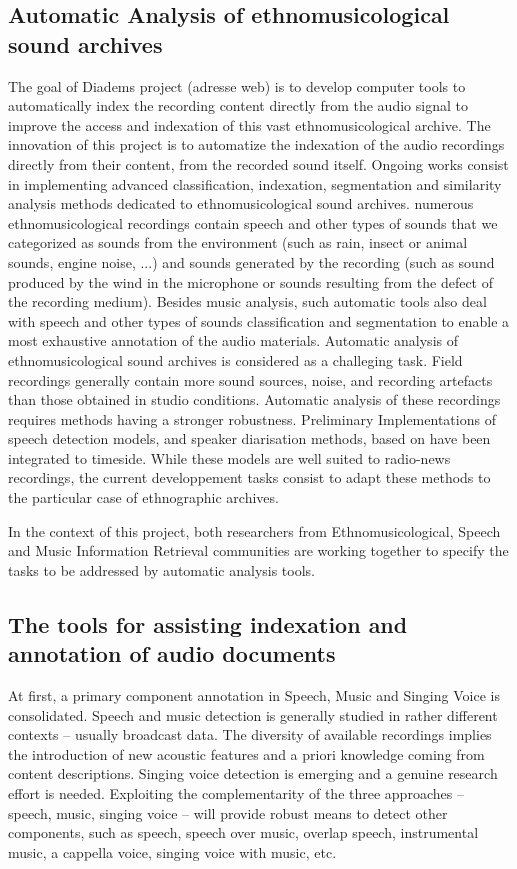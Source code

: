 \documentclass{sig-alternate}
\begin{document}
\subsection{Automatic Analysis of ethnomusicological sound archives}
The goal of Diadems project (adresse web) is to develop computer tools to automatically index the recording content directly from the audio signal to improve the access and indexation of this vast ethnomusicological archive. The innovation of this project is to automatize the indexation of the audio recordings directly from their content, from the recorded sound itself.
Ongoing works consist in implementing advanced classification, indexation, segmentation and similarity analysis methods dedicated to ethnomusicological sound archives.
numerous ethnomusicological recordings contain speech and other types of sounds that we categorized as sounds from the environment (such as rain, insect or animal sounds, engine noise, ...) and sounds generated by the recording (such as sound produced by the wind in the microphone or sounds resulting from the defect of the recording medium).
Besides music analysis, such automatic tools also deal with speech and other types of sounds classification and segmentation to enable a most exhaustive annotation of the audio materials.
Automatic analysis of ethnomusicological sound archives is considered as a challeging task.
Field recordings generally contain more sound sources, noise, and recording artefacts than those obtained in studio conditions.
Automatic analysis of these recordings requires methods having a stronger robustness.
Preliminary Implementations  of speech detection models, and speaker diarisation methods, based on  \cite{barras2006multistage} have been integrated to timeside. 
While these models are well suited to radio-news recordings, the current developpement tasks consist to adapt these methods to the particular case of ethnographic archives.

In the context of this project, both researchers from Ethnomusicological, Speech and Music Information Retrieval communities are working together to specify the tasks to be addressed by automatic analysis tools.

\subsection{The tools for assisting indexation and annotation of audio documents}

At first, a primary component annotation in Speech, Music and Singing Voice is consolidated. Speech and music detection is generally studied in rather different contexts – usually broadcast data. The diversity of available recordings implies the introduction of new acoustic features and a priori knowledge coming from content descriptions. Singing voice detection is emerging and a genuine research effort is needed. Exploiting the complementarity of the three approaches – speech, music, singing voice – will provide robust means to detect other components, such as speech, speech over music, overlap speech, instrumental music, a cappella voice, singing voice with music, etc. 
\end{document}
